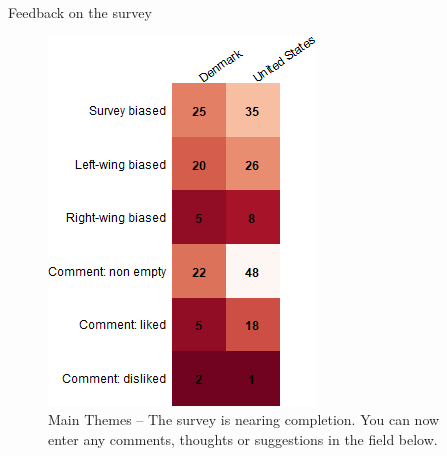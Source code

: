 \documentclass[aspectratio=169,9pt,dvipsnames]{beamer}
\begin{document}
\begin{frame}{Feedback on the survey}%
\vspace{-.2cm}
\begin{figure}[h!]
\caption{Main Themes -- The survey is nearing completion. You can now enter any comments, thoughts or suggestions in the field below.}
\includegraphics[width=.3\textwidth]{../figures/country_comparison/feedback_positive_countries.png}
\end{figure}
\end{frame}



\end{document}
